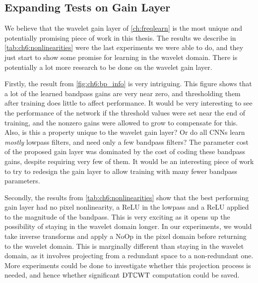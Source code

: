 \subsection{Expanding Tests on Gain Layer}
We believe that the wavelet gain layer of \autoref{ch:freqlearn} is the most
unique and potentially promising piece of work in this thesis. The results we
describe in \autoref{tab:ch6:nonlinearities}
were the last experiments we were able to do, and they just start to show some
promise for learning in the wavelet domain. There is potentially a lot more
research to be done on the wavelet gain layer.

Firstly, the result from \autoref{fig:ch6:bp_info} is very intriguing. This
figure shows that a lot of the learned bandpass gains are very near zero,
and thresholding them after training does little to affect performance. It would
be very interesting to see the performance of the network if the threshold
values were set near the end of training, and the nonzero gains were allowed to
grow to compensate for this. Also, is this a property unique to the wavelet gain
layer? Or do all CNNs learn \emph{mostly} lowpass filters, and need only a few
bandpass filters? The parameter cost of the proposed gain layer was dominated
by the cost of coding these bandpass gains, despite requiring very few of them.
It would be an interesting piece of work to try to redesign the gain layer to
allow training with many fewer bandpass parameters.

Secondly, the results from \autoref{tab:ch6:nonlinearities} show that the best
performing gain layer had no pixel nonlinearity, a ReLU in the lowpass and
a ReLU applied to the magnitude of the bandpass. This is very exciting as it
opens up the possibility of staying in the wavelet domain longer. In our
experiments, we would take inverse transforms and apply a NoOp in the pixel
domain before returning to the wavelet domain. This is marginally different
than staying in the wavelet domain, as it involves projecting from a redundant
space to a non-redundant one. More experiments could be done to investigate
whether this projection process is needed, and hence whether significant
$\mathrm{DT}\mathbb{C}\mathrm{WT}$ computation could be saved.

